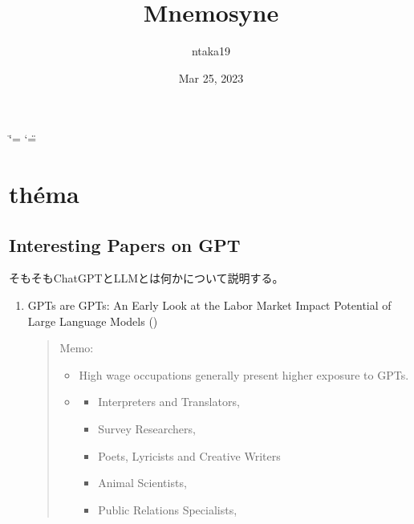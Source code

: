 \documentclass[letterpaper,10pt,english]{sphinxmanual}
\title{Mnemosyne}
\date{Mar 25, 2023}
\author{ntaka19}
\let\sphinxpxdimen\pdfpxdimen\else\newdimen\sphinxpxdimen
\begin{document}
\ifdefined\shorthandoff
  \ifnum\catcode`\=\string=\active\shorthandoff{=}\fi
  \ifnum\catcode`\"=\active{}\fi
\fi

\pagestyle{empty}
\sphinxmaketitle
\pagestyle{plain}
\sphinxtableofcontents
\pagestyle{normal}
\label{\detokenize{index::doc}}
\noindent{\sphinxincludegraphics[width=80\sphinxpxdimen]{{profile2}.png}\hspace*{\fill}}




\chapter{théma}
\label{\detokenize{index:thema}}
\sphinxstepscope


\section{Interesting Papers on GPT}
\label{\detokenize{src/theme/chatgpt_papers:interesting-papers-on-gpt}}\label{\detokenize{src/theme/chatgpt_papers::doc}}
\sphinxAtStartPar
そもそもChatGPTとLLMとは何かについて説明する。
\begin{enumerate}
%
\item {} 
\sphinxAtStartPar
GPTs are GPTs: An Early Look at the Labor Market Impact Potential of Large Language Models ()
\begin{quote}

\sphinxAtStartPar
Memo:
\begin{itemize}
\item {} 
\sphinxAtStartPar
High wage occupations generally present higher exposure to GPTs.

\item {} \begin{description}
\begin{itemize}
\item {} 
\sphinxAtStartPar
Interpreters and Translators,

\item {} 
\sphinxAtStartPar
Survey Researchers,

\item {} 
\sphinxAtStartPar
Poets, Lyricists and Creative Writers

\item {} 
\sphinxAtStartPar
Animal Scientists,

\item {} 
\sphinxAtStartPar
Public Relations Specialists,

\end{itemize}

\end{description}

\end{itemize}
\end{quote}

\end{enumerate}
\end{document}

